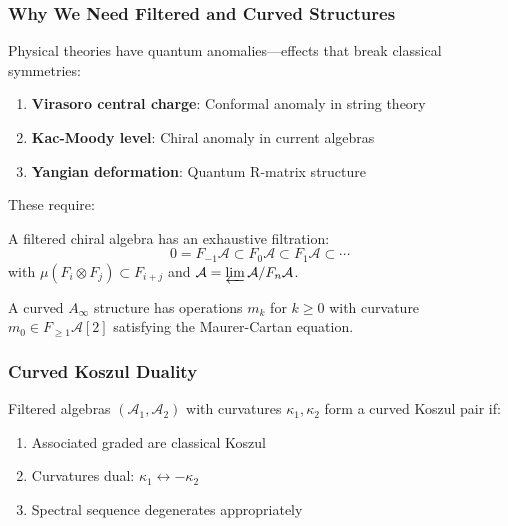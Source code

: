 \subsubsection{Why We Need Filtered and Curved Structures}

Physical theories have quantum anomalies—effects that break classical symmetries:

\begin{example}
\begin{enumerate}
\item \textbf{Virasoro central charge}: Conformal anomaly in string theory
\item \textbf{Kac-Moody level}: Chiral anomaly in current algebras  
\item \textbf{Yangian deformation}: Quantum R-matrix structure
\end{enumerate}
\end{example}

These require:

\begin{definition}
A filtered chiral algebra has an exhaustive filtration:
$$0 = F_{-1}\mathcal{A} \subset F_0\mathcal{A} \subset F_1\mathcal{A} \subset \cdots$$
with $\mu(F_i \otimes F_j) \subset F_{i+j}$ and $\mathcal{A} = \varprojlim \mathcal{A}/F_n\mathcal{A}$.
\end{definition}

\begin{definition}
A curved $A_\infty$ structure has operations $m_k$ for $k \geq 0$ with curvature $m_0 \in F_{\geq 1}\mathcal{A}[2]$ satisfying the Maurer-Cartan equation.
\end{definition}

\subsubsection{Curved Koszul Duality}

\begin{theorem}
Filtered algebras $(\mathcal{A}_1, \mathcal{A}_2)$ with curvatures $\kappa_1, \kappa_2$ form a curved Koszul pair if:
\begin{enumerate}
\item Associated graded are classical Koszul
\item Curvatures dual: $\kappa_1 \leftrightarrow -\kappa_2$
\item Spectral sequence degenerates appropriately
\end{enumerate}
\end{theorem}

